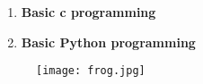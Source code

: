 \documentclass{beamer}
\begin{document}
\begin{frame}
\begin{enumerate}
   \item \textbf{Basic c programming}
 \item \textbf{Basic Python programming }
\end{enumerate}
\end{frame}

\begin{figure}
    \centering
    \texttt{[image: frog.jpg]}
    \caption{\label{fig:frog}\color{red}{This is the image I have uploaded}}
    \label{fig:FROG}
\end{figure}
\end{document}
